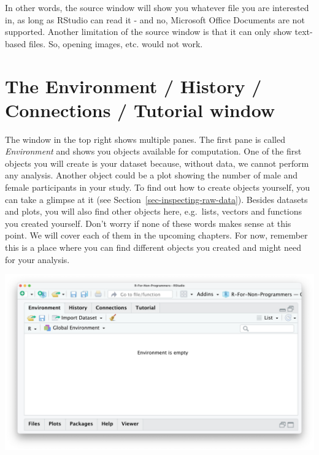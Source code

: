\documentclass[
  letterpaper,
]{krantz}
\begin{document}
In other words, the source window will show you whatever file you are
interested in, as long as RStudio can read it - and no, Microsoft Office
Documents are not supported. Another limitation of the source window is
that it can only show text-based files. So, opening images, etc. would
not work.

\section{The Environment / History / Connections / Tutorial
window}\label{sec-the-environment-history-connections-tutorial-window}

The window in the top right shows multiple panes. The first pane is
called \emph{Environment} and shows you objects available for
computation. One of the first objects you will create is your dataset
because, without data, we cannot perform any analysis. Another object
could be a plot showing the number of male and female participants in
your study. To find out how to create objects yourself, you can take a
glimpse at it (see Section~\ref{sec-inspecting-raw-data}). Besides
datasets and plots, you will also find other objects here, e.g.~lists,
vectors and functions you created yourself. Don't worry if none of these
words makes sense at this point. We will cover each of them in the
upcoming chapters. For now, remember this is a place where you can find
different objects you created and might need for your analysis.

\includegraphics{images/chapter_04_img/04_environment_history_etc/01_rstudio_environment.png}
\end{document}
